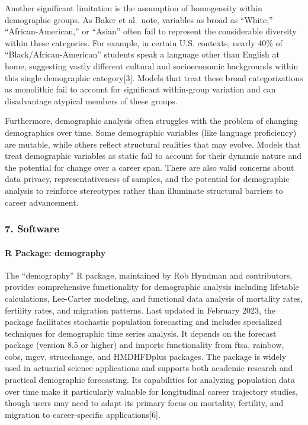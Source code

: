 \documentclass[./main.tex]{subfiles}
\begin{document}
Another significant limitation is the assumption of homogeneity within
demographic groups. As Baker et al.~note, variables as broad as
``White,'' ``African-American,'' or ``Asian'' often fail to represent
the considerable diversity within these categories. For example, in
certain U.S. contexts, nearly 40\% of ``Black/African-American''
students speak a language other than English at home, suggesting vastly
different cultural and socioeconomic backgrounds within this single
demographic category{[}3{]}. Models that treat these broad
categorizations as monolithic fail to account for significant
within-group variation and can disadvantage atypical members of these
groups.

Furthermore, demographic analysis often struggles with the problem of
changing demographics over time. Some demographic variables (like
language proficiency) are mutable, while others reflect structural
realities that may evolve. Models that treat demographic variables as
static fail to account for their dynamic nature and the potential for
change over a career span. There are also valid concerns about data
privacy, representativeness of samples, and the potential for
demographic analysis to reinforce stereotypes rather than illuminate
structural barriers to career advancement.

\subsubsection{7. Software}\label{software}

\paragraph{R Package: demography}\label{r-package-demography}

The ``demography'' R package, maintained by Rob Hyndman and
contributors, provides comprehensive functionality for demographic
analysis including lifetable calculations, Lee-Carter modeling, and
functional data analysis of mortality rates, fertility rates, and
migration patterns. Last updated in February 2023, the package
facilitates stochastic population forecasting and includes specialized
techniques for demographic time series analysis. It depends on the
forecast package (version 8.5 or higher) and imports functionality from
ftsa, rainbow, cobs, mgcv, strucchange, and HMDHFDplus packages. The
package is widely used in actuarial science applications and supports
both academic research and practical demographic forecasting. Its
capabilities for analyzing population data over time make it
particularly valuable for longitudinal career trajectory studies, though
users may need to adapt its primary focus on mortality, fertility, and
migration to career-specific applications{[}6{]}.
\end{document}
